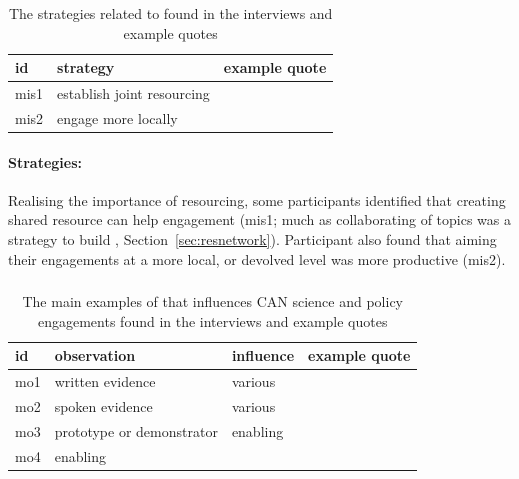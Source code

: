 \begin{table}[!ht]
\footnotesize
\caption{The strategies related to \ismmi{} found in the interviews and example quotes}\label{tab:resinfrastrat}
\begin{tabular}{L{.06\linewidth}L{.3\linewidth}L{.64\linewidth}} \hline
\textbf{id} & \textbf{strategy} & \textbf{example quote} \\ \hline \hline
mis1 & establish joint resourcing &  \\[5mm]
mis2 & engage more locally &  \\[5mm]
 \hline
 \end{tabular}
\end{table}

\paragraph{Strategies:}
Realising the importance of resourcing, some participants identified that creating shared resource can help engagement (mis1; much as collaborating of topics was a strategy to build \ismsnr{}, Section~\ref{sec:resnetwork}). Participant also found that aiming their engagements at a more local, or devolved level was more productive (mis2).

\subsubsection{\ismmo}\label{sec:resobjects}

\begin{table}[!ht]
\footnotesize
\caption{The main examples of \ismmo{} that influences CAN science and policy  engagements found in the interviews and example quotes}\label{tab:resobjects}
\begin{tabular}{L{.06\linewidth}L{.3\linewidth}L{.12\linewidth}L{.52\linewidth}} \hline
\textbf{id} & \textbf{observation} & \textbf{influence} & \textbf{example quote} \\ \hline \hline 
mo1 & written evidence & various &  \\[5mm]
mo2 & spoken evidence & various &  \\[5mm]
mo3 & prototype or demonstrator & enabling &  \\[5mm]
mo4 & enabling & 
 \hline
\end{tabular}
\end{table}

